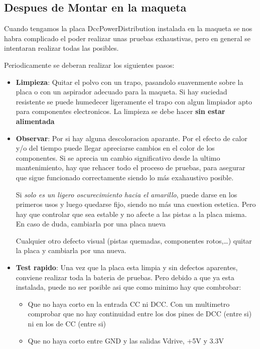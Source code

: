 \subsection{Despues de Montar en la maqueta}
Cuando tengamos la placa DccPowerDistribution instalada en la maqueta se nos habra complicado
el poder realizar unas pruebas exhaustivas, pero en general se intentaran realizar todas las posibles.

Periodicamente se deberan realizar los siguientes pasos:
\begin{itemize}
\item \textbf{Limpieza}: Quitar el polvo con un trapo, pasandolo suavenmente sobre la placa o con un aspirador adecuado para la maqueta.
Si hay suciedad resistente se puede humedecer ligeramente el trapo con algun limpiador apto para
componentes electronicos. La limpieza se debe hacer \textbf{sin estar alimentada}

\item \textbf{Observar}: Por si hay alguna descoloracion aparante. Por el efecto de calor y/o del tiempo puede llegar apreciarse cambios
en el color de los componentes. Si se aprecia un cambio significativo desde la ultimo mantenimiento,
hay que rehacer todo el proceso de pruebas, para asegurar que sigue funcionado correctamente siendo
lo más exahaustivo posible. 

Si \textit{solo es un ligero oscurecimiento hacia el amarillo}, puede darse en los primeros usos y
luego quedarse fijo, siendo no más una cuestion estetica. Pero hay que controlar que sea estable y
no afecte a las pistas a la placa misma. En caso de duda, cambiarla por una placa nueva

Cualquier otro defecto visual (pistas quemadas, componentes rotos,\dots) quitar la placa y cambiarla por una nueva.
\item \textbf{Test rapido}: Una vez que la placa esta limpia y sin defectos aparentes, conviene
realizar toda la bateria de pruebas. Pero debido a que ya esta instalada, puede no ser posible asi
que como minimo hay que combrobar:
\begin{itemize}
\item Que no haya corto en la entrada CC ni DCC. Con un multimetro comprobar que no hay continuidad entre los dos pines de DCC (entre si) ni en los de CC (entre si)
\item Que no haya corto entre GND y las salidas Vdrive, +5V y 3.3V
\end{itemize}

\end{itemize}


